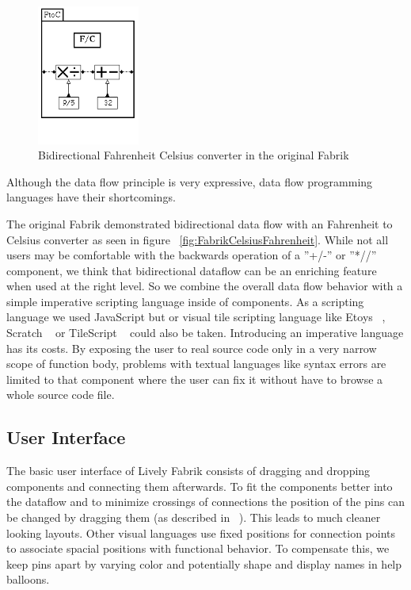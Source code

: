 \documentclass[pdftex, times, 10pt, twocolumn]{article}
\begin{document}
\begin{figure}[]\centering
\includegraphics[width=0.300000\textwidth]{Fabrik_figure2b.png} 

\caption{Bidirectional Fahrenheit Celsius converter in the original Fabrik }
\label{fig:FabrikCelsiusFahrenheitOriginal}
\end{figure}
Although the data flow principle is very expressive, data flow programming languages have their shortcomings. 

The original Fabrik demonstrated bidirectional data flow with an Fahrenheit to Celsius converter as seen in figure ~\ref{fig:FabrikCelsiusFahrenheit}. While not all users may be comfortable with the backwards operation of a ''+/-'' or ''*//'' component, we think that bidirectional dataflow can be an enriching feature when used at the right level. So we combine the overall data flow behavior with a simple imperative scripting language inside of components.  As a scripting language we used JavaScript but or visual tile scripting language like Etoys ~\cite{Kay2005SEA}, Scratch ~\cite{Maloney2004SSP} or TileScript ~\cite{Warth2008TMS} could also be taken.  Introducing an imperative language has its costs. By exposing the user to real source code only in a very narrow scope of function body, problems with textual languages like syntax errors are limited to that component where the user can fix it without have to browse a whole source code file.  



\subsection{User Interface}
The basic user interface of Lively Fabrik consists of dragging and dropping components and connecting them afterwards. To fit the components better into the dataflow and to minimize crossings of connections the position of the pins can be changed by dragging them (as described in ~\cite{Ludolph1988FPE}). This leads to much cleaner looking layouts. Other visual languages use fixed positions for connection points to associate spacial positions with functional behavior. To compensate this, we keep pins apart by varying  color and potentially shape and display names in help balloons.  
\end{document}
